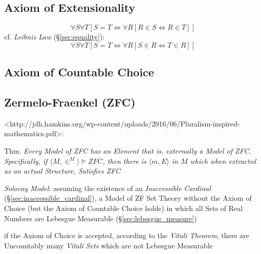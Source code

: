 \subsection{Axiom of Extensionality}\label{sec:extensionality_axiom}

\[
  \forall S \forall T
    [S = T \Leftrightarrow \forall R [ R \in S \Leftrightarrow R \in T ]]
\]
cf. \emph{Leibniz Law} (\S\ref{sec:equality}):
\[
  \forall S \forall T
    [S = T \Leftrightarrow \forall R [ S \in R \Leftrightarrow T \in R ]]
\]


\subsection{Axiom of Countable Choice}\label{sec:countable_choice}

\subsection{Zermelo-Fraenkel (ZFC)}\label{sec:zermelo_fraenkel}

<http://jdh.hamkins.org/wp-content/uploads/2016/06/Pluralism-inspired-mathematics.pdf>:

Thm. \emph{Every Model of ZFC has an Element that is, externally a
  Model of ZFC. Specifically, if $\langle{M,\in^M}\rangle \vDash ZFC$,
then there is $\langle{m,E}\rangle$ in $M$ which when extracted as an
actual Structure, Satisfies ZFC}

\emph{Solovay Model}: assuming the existence of an \emph{Inaccessible Cardinal}
(\S\ref{sec:inaccessible_cardinal}), a Model of ZF Set Theory without the Axiom
of Choice (but the Axiom of Countable Choice holds) in which all Sets of Real
Numbers are Lebesgue Measurable (\S\ref{sec:lebesgue_measure})

if the Axiom of Choice is accepted, according to the \emph{Vitali Theorem},
there are Uncountably many \emph{Vitali Sets} which are not Lebesgue Measurable



